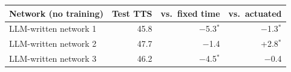 \begin{tabular}{lrrr}
\toprule
Network (no training) & Test TTS & vs.\ fixed time & vs.\ actuated \\
\midrule
LLM-written network 1 & 45.8 & $-$5.3$^{*}$ & $-$1.3$^{*}$ \\
LLM-written network 2 & 47.7 & $-$1.4 & +2.8$^{*}$ \\
LLM-written network 3 & 46.2 & $-$4.5$^{*}$ & $-$0.4 \\
\bottomrule
\end{tabular}
